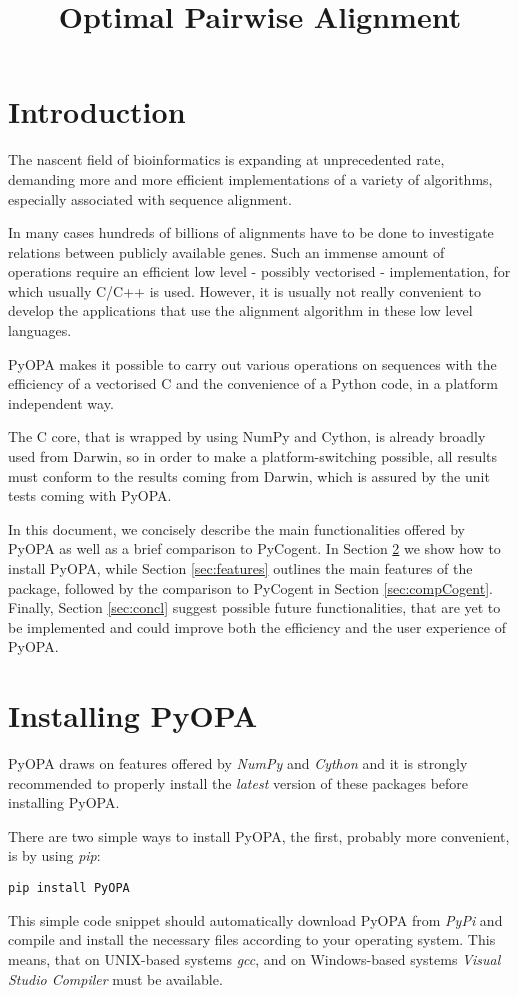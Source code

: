 \documentclass[12pt]{article}
\title{Optimal Pairwise Alignment}
\author{}
\newcommand{\pp}{PyOPA}
\begin{document}
\maketitle
\newpage
\tableofcontents
\newpage
\section{Introduction}
The nascent field of bioinformatics is expanding at unprecedented rate, demanding more and more efficient implementations of a variety of algorithms, especially associated with sequence alignment.

In many cases hundreds of billions of alignments have to be done to investigate relations between publicly available genes. Such an immense amount of operations require an efficient low level - possibly vectorised - implementation, for which usually C/C++ is used. However, it is usually not really convenient to develop the applications that use the alignment algorithm in these low level languages.

\pp{} makes it possible to carry out various operations on sequences with the efficiency of a vectorised C and the convenience of a Python code, in a platform independent way. 

The C core, that is wrapped by using NumPy and Cython, is already broadly used from Darwin, so in order to make a platform-switching possible, all results must conform to the results coming from Darwin, which is assured by the unit tests coming with \pp{}.

In this document, we concisely describe the main functionalities offered by \pp{} as well as a brief comparison to PyCogent. In Section \ref{sec:inst} we show how to install \pp{}, while Section \ref{sec:features} outlines the main features of the package, followed by the comparison to PyCogent in Section \ref{sec:compCogent}. Finally, Section \ref{sec:concl} suggest possible future functionalities, that are yet to be implemented and could improve both the efficiency and the user experience of \pp{}. 

\section{Installing \pp{}}
\label{sec:inst}
\pp{} draws on features offered by \emph{NumPy} and \emph{Cython} and it is strongly recommended to properly install the \emph{latest} version of these packages before installing \pp{}.

There are two simple ways to install \pp{}, the first, probably more convenient, is by using \emph{pip}:
\begin{lstlisting}
pip install PyOPA
\end{lstlisting}
This simple code snippet should automatically download \pp{} from \emph{PyPi} and compile and install the necessary files according to your operating system. This means, that on UNIX-based systems \emph{gcc}, and on Windows-based systems \emph{Visual Studio Compiler} must be available.
\end{document}
